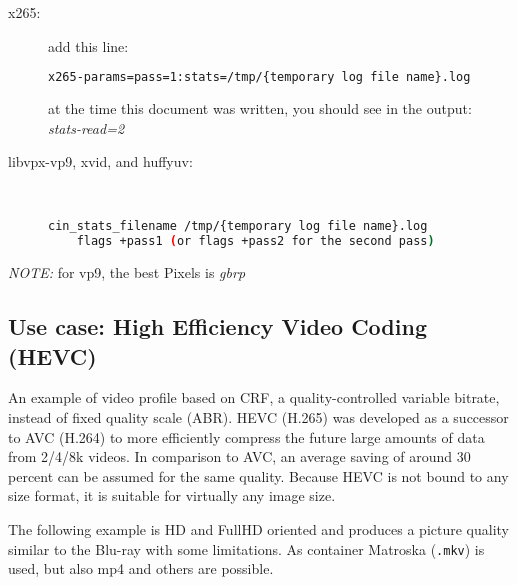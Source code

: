 \begin{description}
    \item[x265:] add this line:
    \begin{lstlisting}[language=bash,numbers=none]
x265-params=pass=1:stats=/tmp/{temporary log file name}.log
    \end{lstlisting}      
    at the time this document was written, you should see in the output: \\  \textit{stats-read=2}
    
    \item[libvpx-vp9, xvid, and huffyuv:]~

    \begin{lstlisting}[language=bash,numbers=none]
    cin_stats_filename /tmp/{temporary log file name}.log
    flags +pass1 (or flags +pass2 for the second pass)
    \end{lstlisting}    
\end{description}

\textit{NOTE:} for vp9, the best Pixels is \textit{gbrp}

\subsection{Use case: High Efficiency Video Coding (HEVC)}%
\label{sub:use_case_hevc}

An example of video profile based on CRF, a quality-controlled
variable bitrate, instead of fixed quality scale (ABR).
HEVC (H.265) was developed as a successor to AVC (H.264) to more
efficiently compress the future large amounts of data from 2/4/8k
videos.
In comparison to AVC, an average saving of around 30 percent can be
assumed for the same quality.
Because HEVC is not bound to any size format, it is suitable for
virtually any image size.

The following example is HD and FullHD oriented and produces a
picture quality similar to the Blu-ray with some limitations.
As container Matroska (\texttt{.mkv}) is used, but also mp4 and others are
possible.

